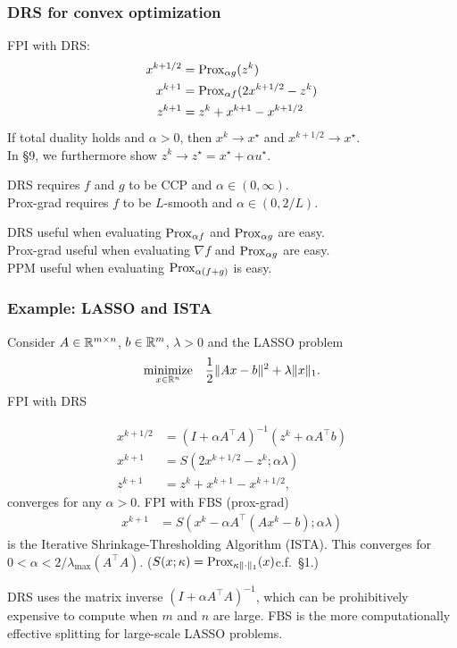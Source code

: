 \documentclass[10pt,mathserif]{beamer}
\begin{document}
\begin{frame}[plain]
\frametitle{DRS for convex optimization}
FPI with DRS:
\begin{align*}
x^{k+1/2}&=\mathrm{Prox}_{\alpha g}(z^k)\nonumber\\
x^{k+1}&=\mathrm{Prox}_{\alpha f}(2x^{k+1/2}-z^k)\\
z^{k+1}&=z^k+x^{k+1}-x^{k+1/2}\nonumber
\end{align*}
If total duality holds and $\alpha>0$, then $x^k\rightarrow x^\star$ and $x^{k+1/2}\rightarrow x^\star$.\\
In \S9, we furthermore show $z^k\rightarrow z^\star=x^\star+\alpha u^\star$.

\vspace{0.2in}

DRS requires $f$ and $g$ to be CCP and $\alpha\in(0,\infty)$.\\
Prox-grad requires $f$ to be $L$-smooth and  $\alpha\in(0,2/L)$.\\
\vspace{0.2in}

DRS useful when evaluating $\mathrm{Prox}_{\alpha f}$ and $\mathrm{Prox}_{\alpha g}$ are easy.\\
Prox-grad useful when evaluating $\nabla f$ and $\mathrm{Prox}_{\alpha g}$ are easy.\\
PPM useful when evaluating $\mathrm{Prox}_{\alpha (f+g)}$ is easy.
\end{frame}

\begin{frame}[plain]
\frametitle{Example: LASSO and ISTA}
Consider $A\in \mathbb{R}^{m\times n}$,  $b\in \mathbb{R}^m$, $\lambda>0$ and
the LASSO problem
\[
\begin{array}{ll}
\underset{x\in \mathbb{R}^n}{\mbox{minimize}}
&
\displaystyle{\frac{1}{2}\|Ax-b\|^2
+\lambda\|x\|_1}.
\end{array}
\]
FPI with DRS
\vspace{-0.3in}

\begin{align*}
x^{k+1/2}&=(I+\alpha A^\intercal A)^{-1}(z^k+\alpha A^\intercal b)\\
x^{k+1}&=S(2x^{k+1/2}-z^k;\alpha \lambda)\\
z^{k+1}&=z^k+x^{k+1}-x^{k+1/2},
\end{align*}
converges for any $\alpha>0$.
FPI with FBS (prox-grad)
\begin{align*}
x^{k+1}&=S(x^k-\alpha A^\intercal(Ax^k-b);\alpha \lambda)
\end{align*}
is the Iterative Shrinkage-Thresholding Algorithm (ISTA).
This converges for $0<\alpha<2/\lambda_\mathrm{max}(A^\intercal A)$.
($S(x;\kappa )=\mathrm{Prox}_{\kappa\|\cdot\|_1}(x)$c.f.\  \S1.)
\vspace{0.1in}

DRS uses the matrix inverse $(I+\alpha A^\intercal A)^{-1}$, which can be prohibitively expensive to compute when $m$ and $n$ are large.
FBS is the more computationally effective splitting for large-scale LASSO problems.
\end{frame}
\end{document}

